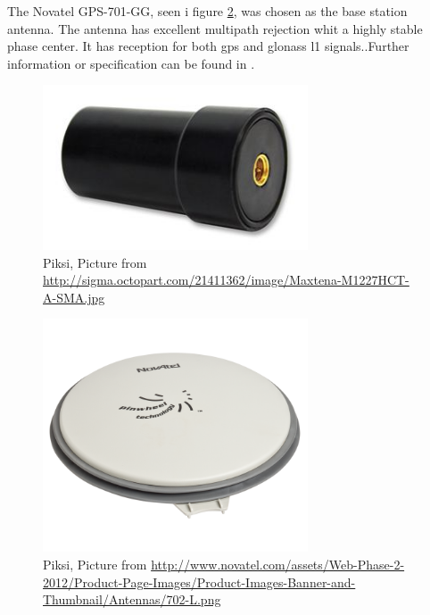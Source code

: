 The Novatel GPS-701-GG, seen i figure \ref{figure:Novatel}, was chosen as the base station antenna. The antenna has excellent multipath rejection whit a highly stable phase center. It has reception for both \gls{gps} and \gls{glonass} \gls{l1} signals..Further information or specification can be found in \citep{novatel}.

\begin{figure}[H]
	\centering
		\includegraphics[width=0.7\textwidth]{figs/Maxtena-M1227HCT-A-SMA-image.jpg}
		\caption{Piksi, Picture from \url{http://sigma.octopart.com/21411362/image/Maxtena-M1227HCT-A-SMA.jpg}}
		\label{figure:Maxtena}
\end{figure}

\begin{figure}[H]
	\centering
		\includegraphics[width=0.7\textwidth]{figs/702-L.png}
		\caption{Piksi, Picture from \url{http://www.novatel.com/assets/Web-Phase-2-2012/Product-Page-Images/Product-Images-Banner-and-Thumbnail/Antennas/702-L.png}}
		\label{figure:Novatel}
\end{figure}


